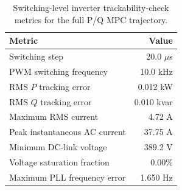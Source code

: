 \begin{table}[!t]
\centering
\caption{Switching-level inverter trackability-check metrics for the full P/Q MPC trajectory.}
\label{tab:switching_inverter_validation}
\begin{tabular}{lr}
\toprule
Metric & Value \\
\midrule
Switching step & 20.0 $\mu$s \\
PWM switching frequency & 10.0 kHz \\
RMS $P$ tracking error & 0.012 kW \\
RMS $Q$ tracking error & 0.010 kvar \\
Maximum RMS current & 4.72 A \\
Peak instantaneous AC current & 37.75 A \\
Minimum DC-link voltage & 389.2 V \\
Voltage saturation fraction & 0.00\% \\
Maximum PLL frequency error & 1.650 Hz \\
\bottomrule
\end{tabular}
\end{table}
